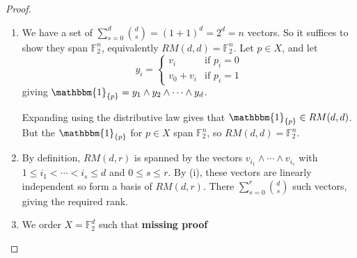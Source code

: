 \documentclass{article}
\newcommand{\F}{\mathbb{F}}
\newcommand{\1}[1]{\mathbbm{1}_{#1}}
\begin{document}
\begin{proof}
    \leavevmode
    \begin{enumerate}[label=(\roman*)]
        \item We have a set of $\sum_{s=0}^d \binom{d}{s} = (1+1)^d = 2^d = n$ vectors.
            So it suffices to show they span $\F_2^n$, equivalently $RM(d, d) = \F_2^n$.
            Let $p \in X$, and let
            \begin{equation*}
                y_i =
                \begin{cases}
                    v_i & \text{if } p_i = 0 \\
                    v_0 + v_i & \text{if } p_i = 1
                \end{cases}
            \end{equation*}
            giving $\1{\{p\}} = y_1 \wedge y_2 \wedge \dotsb \wedge y_d$.

            Expanding using the distributive law gives that $\1{\{p\}} \in RM(d, d)$.
            But the $\1{\{p\}}$ for $p \in X$ span $\F_2^n$, so $RM(d, d) = \F_2^n$.
        \item By definition, $RM(d, r)$ is spanned by the vectors $v_{i_1} \wedge \dotsb \wedge v_{i_s}$ with $1 \leq i_1 < \dotsb < i_s \leq d$ and $0 \leq s \leq r$.
            By (i), these vectors are linearly independent so form a basis of $RM(d, r)$.
            There $\sum_{s=0}^r \binom{d}{s}$ such vectors, giving the required rank.
        \item We order $X = \F_2^d$ such that
            \textbf{missing proof}
    \end{enumerate}
\end{proof}
\end{document}
